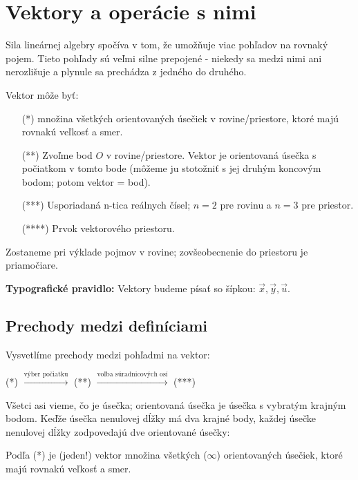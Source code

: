 \documentclass[11pt]{article}
\title{}
\author{}
\date{}
\renewcommand{\vec}[1]{\overrightarrow{#1}}
\begin{document}
\section{Vektory a operácie s nimi}

Sila lineárnej algebry spočíva v tom, že umožňuje viac pohľadov na rovnaký pojem. Tieto pohľady sú veľmi silne prepojené - niekedy sa medzi nimi ani nerozlišuje a plynule sa prechádza z jedného do druhého.

\noindent Vektor môže byť:
\begin{itemize}
    \item[(*)] množina všetkých orientovaných úsečiek v rovine/priestore, ktoré majú rovnakú veľkosť a smer.
    \item[(**)] Zvoľme bod $O$ v rovine/priestore. Vektor je orientovaná úsečka s počiatkom v tomto bode (môžeme ju stotožniť s jej druhým koncovým bodom; potom vektor = bod).
    \item[(***)] Usporiadaná n-tica reálnych čísel; $n=2$ pre rovinu a $n=3$ pre priestor.
    \item[(****)] Prvok vektorového priestoru.
\end{itemize}

Zostaneme pri výklade pojmov v rovine; zovšeobecnenie do priestoru je priamočiare.

\noindent \textbf{Typografické pravidlo:}
Vektory budeme písať so šípkou: $\vec{x}, \vec{y}, \vec{u}$.

\hrulefill

\subsection{Prechody medzi definíciami}
Vysvetlíme prechody medzi pohľadmi na vektor:
\begin{center}
    (*) $\xrightarrow{\text{výber počiatku}}$ (**) $\xrightarrow{\text{voľba súradnicových osí}}$ (***)
\end{center}

Všetci asi vieme, čo je úsečka; orientovaná úsečka je úsečka s vybratým krajným bodom. Keďže úsečka nenulovej dĺžky má dva krajné body, každej úsečke nenulovej dĺžky zodpovedajú dve orientované úsečky:

\begin{center}
\end{center}
Podľa (*) je (jeden!) vektor množina všetkých ($\infty$) orientovaných úsečiek, ktoré majú rovnakú veľkosť a smer.
\end{document}
